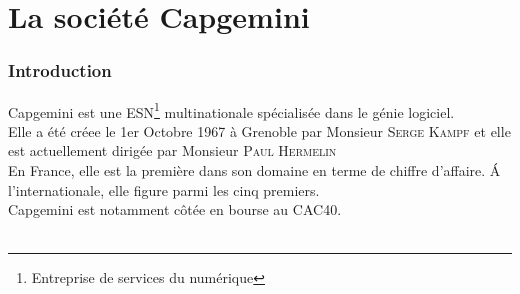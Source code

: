 \chapter{La société Capgemini}
\subsection*{Introduction}
Capgemini est une ESN\footnote{Entreprise de services du numérique} multinationale spécialisée dans le génie logiciel.
\\Elle a été créee le 1er Octobre 1967 à Grenoble par Monsieur \textsc{Serge Kampf} et elle est actuellement dirigée par  Monsieur \textsc{Paul Hermelin}\\
En France, elle est la première dans son domaine en terme de chiffre d'affaire. \'A l'internationale, elle figure parmi les cinq premiers.
\\Capgemini est notamment côtée en bourse au CAC40.
\\\\
\begin{figure}[h]
\end{figure}

\newpage
